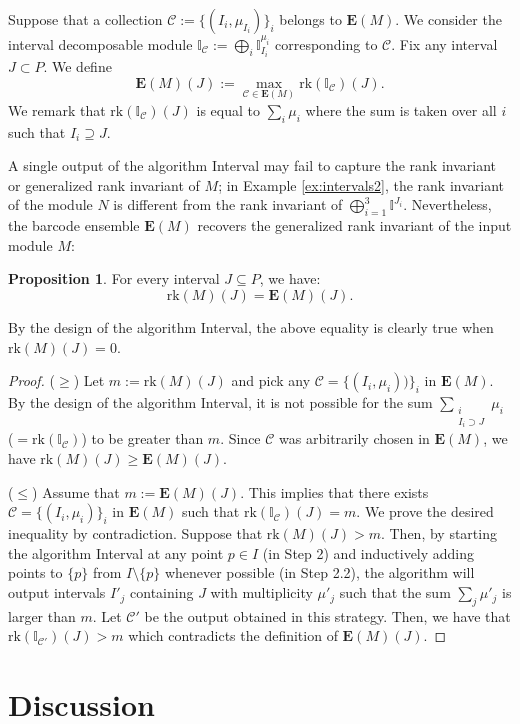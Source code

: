 \documentclass[11pt]{article}
\theoremstyle{definition}
\newtheorem{proposition}[theorem]{Proposition}
\newcommand{\bE}{\mathbf{E}}
\newcommand{\bbI}{\mathbb{I}}
\newcommand{\Ccal}{\mathcal{C}}
\newcommand{\rk}{\mathrm{rk}}
\newcommand{\C}{\mathcal{C}}
\begin{document}
Suppose that a collection $\Ccal:=\{(I_i,\mu_{I_i})\}_i$ belongs to $\bE(M)$. We consider the interval decomposable module  $\mathbb{I}_\Ccal:=\bigoplus_i \mathbb{I}_{I_i}^{\mu_i}$ corresponding to $\Ccal$. Fix any interval $J\subset P$. We define \[\bE(M)(J):=\max_{\Ccal \in \bE(M)} \rk(\bbI_{\Ccal})(J).\]
We remark that $\rk(\bbI_{\Ccal})(J)$ is equal to $\sum_{i} \mu_i$ where the sum is taken over all $i$ such that $I_i\supseteq J$.

A single output of the algorithm {\sc Interval} may fail to capture the rank invariant or generalized rank invariant of $M$; in Example \ref{ex:intervals2}, the rank invariant of the module $N$  is different from the rank invariant of $\bigoplus_{i=1}^3\bbI^{J_i}$. Nevertheless, the barcode ensemble $\bE(M)$ recovers the generalized rank invariant of the input module $M$:

\begin{proposition}\label{prop:rk is recovered} For every interval $J\subseteq P$, we have:
\[\rk(M)(J)=\bE(M)(J).\]
\end{proposition}
By the design of the algorithm {\sc Interval}, the above equality is clearly  true when $\rk(M)(J)=0$.
\begin{proof}
($\geq$) Let $m:=\rk(M)(J)$ and pick any $\Ccal=\{(I_i,\mu_i))\}_i$ in $\bE(M)$. By the design of the algorithm {\sc Interval}, it is not possible for the sum $\displaystyle \sum_{\substack{i \\ I_i\supset J}} \mu_i$ ($=\rk(\bbI_{\C})$) to be greater than $m$. Since $\Ccal$ was arbitrarily chosen in $\bE(M)$, we have $\rk(M)(J)\geq \bE(M)(J)$.

($\leq$) Assume that $m:=\bE(M)(J)$. This implies that there exists $\Ccal=\{(I_i,\mu_i)\}_i$ in $\bE(M)$ such that $\rk(\bbI_\C)(J)=m$. We prove the desired inequality by contradiction. Suppose that $\rk(M)(J)>m$. Then, by starting the algorithm {\sc Interval} at any point $p\in I$ (in Step 2) and inductively adding points to $\{p\}$ from $I\setminus \{p\}$ whenever possible (in Step 2.2), the algorithm will output intervals $I'_j$ containing $J$ with multiplicity $\mu'_j$ such that the sum $\sum_{j}\mu'_j$ is larger than $m$. Let $\Ccal'$ be the output obtained in this strategy. Then, we have that $\rk(\bbI_{\Ccal'})(J)>m$ which contradicts the definition of $\bE(M)(J)$.
\end{proof}




\section{Discussion}\label{sec:discussion}
\end{document}
